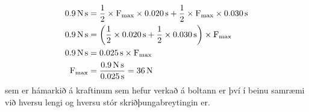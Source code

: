\begin{formalexample}
\begin{align*}
	\SI{0.9}{\N\s} &= 
		\frac{1}{2} \times \uforce_\text{max} \times \SI{0.020}{\s}
		+ \frac{1}{2} \times \uforce_\text{max} \times \SI{0.030}{\s} \\
	\SI{0.9}{\N\s} &=
		\left(
			\frac{1}{2} \times  \SI{0.020}{\s}
			+ \frac{1}{2} \times \SI{0.030}{\s} 
		\right) 
		\times 
		\uforce_\text{max} \\
	\SI{0.9}{\N\s} &=
		\SI{0.025}{\s} \times \uforce_\text{max} \\
	\uforce_\text{max} &=
		\frac{ \SI{0.9}{\N\s} }{ \SI{0.025}{\s} }
		= \SI{36}{\N}
\end{align*}
sem er hámarkið á kraftinum sem hefur verkað á boltann er því í beinu samræmi við hversu
lengi og hversu stór skriðþungabreytingin er.
\end{formalexample}

